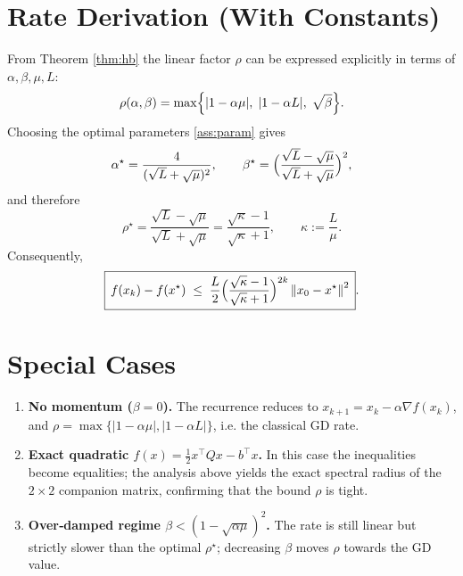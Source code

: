 \documentclass{article}
\newcommand{\norm}[1]{\left\|#1\right\|}
\begin{document}
\section*{Rate Derivation (With Constants)}
From Theorem \ref{thm:hb} the linear factor $\rho$ can be expressed explicitly in terms of $\alpha,\beta,\mu,L$:
\[
\rho(\alpha,\beta)=\max\Bigl\{|1-\alpha\mu|,\;|1-\alpha L|,\;\sqrt{\beta}\Bigr\}.
\]
Choosing the optimal parameters \eqref{ass:param} gives
\[
\alpha^{\star}= \frac{4}{(\sqrt{L}+\sqrt{\mu})^{2}},\qquad
\beta^{\star}= \Bigl(\frac{\sqrt{L}-\sqrt{\mu}}{\sqrt{L}+\sqrt{\mu}}\Bigr)^{2},
\]
and therefore
\[
\rho^{\star}= \frac{\sqrt{L}-\sqrt{\mu}}{\sqrt{L}+\sqrt{\mu}}
            = \frac{\sqrt{\kappa}-1}{\sqrt{\kappa}+1},
\qquad \kappa:=\frac{L}{\mu}.
\]
Consequently,
\[
\boxed{\,f(x_k)-f(x^\star)\;\le\;
\frac{L}{2}\Bigl(\frac{\sqrt{\kappa}-1}{\sqrt{\kappa}+1}\Bigr)^{2k}
\norm{x_0-x^\star}^{2}\,}.
\]

\section*{Special Cases}
\begin{enumerate}
\item \textbf{No momentum ($\beta=0$).}  The recurrence reduces to
      $x_{k+1}=x_k-\alpha\nabla f(x_k)$, and $\rho=\max\{|1-\alpha\mu|,|1-\alpha L|\}$,
      i.e. the classical GD rate.
\item \textbf{Exact quadratic $f(x)=\frac12 x^{\top}Qx-b^{\top}x$.}
      In this case the inequalities become equalities; the analysis above
      yields the exact spectral radius of the $2\times2$ companion matrix,
      confirming that the bound $\rho$ is tight.
\item \textbf{Over‑damped regime $\beta<(1-\sqrt{\alpha\mu})^{2}$.}
      The rate is still linear but strictly slower than the optimal
      $\rho^{\star}$; decreasing $\beta$ moves $\rho$ towards the GD value.
\end{enumerate}
\end{document}
